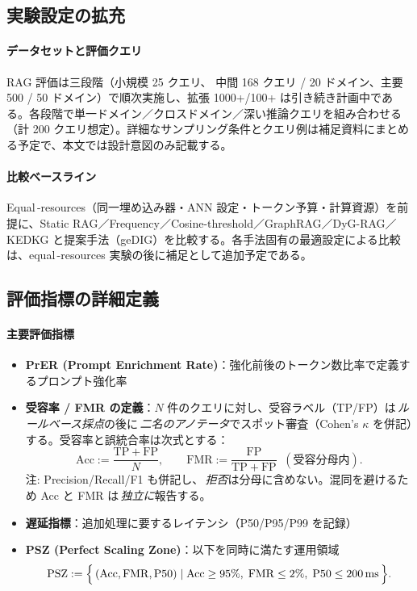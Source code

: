 \documentclass[ja=standard,xelatex]{bxjsarticle}
\begin{document}
\subsection{実験設定の拡充}

\paragraph{データセットと評価クエリ}
RAG 評価は三段階（小規模 25 クエリ、
中間 168 クエリ / 20 ドメイン、主要 500 / 50 ドメイン）で順次実施し、拡張 1000+/100+ は引き続き計画中である。各段階で単一ドメイン／クロスドメイン／深い推論クエリを組み合わせる（計 200 クエリ想定）。詳細なサンプリング条件とクエリ例は補足資料にまとめる予定で、本文では設計意図のみ記載する。

\paragraph{比較ベースライン}
Equal\,\mbox{-}resources（同一埋め込み器・ANN 設定・トークン予算・計算資源）を前提に、Static RAG／Frequency／Cosine-threshold／GraphRAG\cite{graphrag2024}／DyG-RAG\cite{dygrag2024}／KEDKG\cite{kedkg2024} と提案手法（geDIG）を比較する。各手法固有の最適設定による比較は、equal\,\mbox{-}resources 実験の後に補足として追加予定である。

\subsection{評価指標の詳細定義}

\paragraph{主要評価指標}
\begin{itemize}
  \item \textbf{PrER (Prompt Enrichment Rate)}：強化前後のトークン数比率で定義するプロンプト強化率
  \item \textbf{受容率 / FMR の定義}：$N$ 件のクエリに対し、受容ラベル（TP/FP）は\,\emph{ルールベース採点}の後に\,\emph{二名のアノテータ}でスポット審査（Cohen's $\kappa$ を併記）する。受容率と誤統合率は次式とする：
  \begin{equation}
    \mathrm{Acc} := \frac{\mathrm{TP}+\mathrm{FP}}{N},\qquad
    \mathrm{FMR} := \frac{\mathrm{FP}}{\mathrm{TP}+\mathrm{FP}}\;\; (\text{受容分母内}).
  \end{equation}
  \noindent 注: Precision/Recall/F1 も併記し、\,\emph{拒否}は分母に含めない。混同を避けるため Acc と FMR は\,\emph{独立に}報告する。
  \item \textbf{遅延指標}：追加処理に要するレイテンシ（P50/P95/P99 を記録）
  \item \textbf{PSZ (Perfect Scaling Zone)}：以下を同時に満たす運用領域
  \begin{equation}
    \text{PSZ} := \Bigl\{\,(\mathrm{Acc},\mathrm{FMR},\mathrm{P50}) \mid \mathrm{Acc}\ge 95\%,\; \mathrm{FMR}\le 2\%,\; \mathrm{P50}\le \SI{200}{ms}\,\Bigr\}.
  \end{equation}
\end{itemize}
\end{document}
